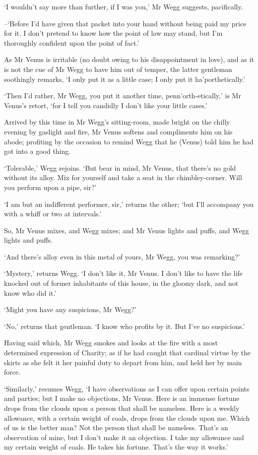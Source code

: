 ‘I wouldn’t say more than further, if I was you,’ Mr Wegg suggests,
pacifically.

--‘Before I’d have given that packet into your hand without being paid
my price for it. I don’t pretend to know how the point of law may stand,
but I’m thoroughly confident upon the point of fact.’

As Mr Venus is irritable (no doubt owing to his disappointment in love),
and as it is not the cue of Mr Wegg to have him out of temper, the
latter gentleman soothingly remarks, ‘I only put it as a little case; I
only put it ha’porthetically.’

‘Then I’d rather, Mr Wegg, you put it another time, penn’orth-etically,’
is Mr Venus’s retort, ‘for I tell you candidly I don’t like your little
cases.’

Arrived by this time in Mr Wegg’s sitting-room, made bright on the
chilly evening by gaslight and fire, Mr Venus softens and compliments
him on his abode; profiting by the occasion to remind Wegg that he
(Venus) told him he had got into a good thing.

‘Tolerable,’ Wegg rejoins. ‘But bear in mind, Mr Venus, that there’s
no gold without its alloy. Mix for yourself and take a seat in the
chimbley-corner. Will you perform upon a pipe, sir?’

‘I am but an indifferent performer, sir,’ returns the other; ‘but I’ll
accompany you with a whiff or two at intervals.’

So, Mr Venus mixes, and Wegg mixes; and Mr Venus lights and puffs, and
Wegg lights and puffs.

‘And there’s alloy even in this metal of yours, Mr Wegg, you was
remarking?’

‘Mystery,’ returns Wegg. ‘I don’t like it, Mr Venus. I don’t like to
have the life knocked out of former inhabitants of this house, in the
gloomy dark, and not know who did it.’

‘Might you have any suspicions, Mr Wegg?’

‘No,’ returns that gentleman. ‘I know who profits by it. But I’ve no
suspicions.’

Having said which, Mr Wegg smokes and looks at the fire with a most
determined expression of Charity; as if he had caught that cardinal
virtue by the skirts as she felt it her painful duty to depart from him,
and held her by main force.

‘Similarly,’ resumes Wegg, ‘I have observations as I can offer upon
certain points and parties; but I make no objections, Mr Venus. Here
is an immense fortune drops from the clouds upon a person that shall be
nameless. Here is a weekly allowance, with a certain weight of coals,
drops from the clouds upon me. Which of us is the better man? Not the
person that shall be nameless. That’s an observation of mine, but I
don’t make it an objection. I take my allowance and my certain weight of
coals. He takes his fortune. That’s the way it works.’

